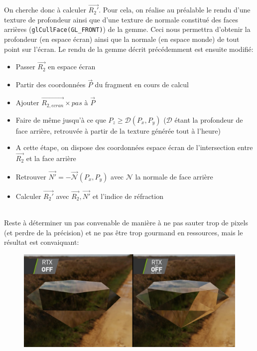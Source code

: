 \documentclass[a4paper,12pt]{article}
\begin{document}
On cherche donc à calculer $\overrightarrow{R_2'}$. Pour cela, on réalise au préalable le rendu d'une texture de profondeur ainsi
que d'une texture de normale constitué des faces arrières (\texttt{glCullFace(GL\_FRONT)}) de la gemme. Ceci nous permettra d'obtenir
la profondeur (en espace écran) ainsi que la normale (en espace monde) de tout point sur l'écran. Le rendu de la gemme décrit précédemment
est ensuite modifié:
\begin{itemize}
    \item Passer $\overrightarrow{R_2}$ en espace écran
    \item Partir des coordonnées $\overrightarrow{P}$ du fragment en cours de calcul
    \item Ajouter $\overrightarrow{R_{2,ecran}}\times pas$ à $\overrightarrow{P}$
    \item Faire de même jusqu'à ce que $P_z \geq \mathcal{D}(P_x, P_y)$ ($\mathcal{D}$ étant la profondeur de face arrière, retrouvée à partir de la texture générée tout à l'heure)
    \item A cette étape, on dispose des coordonnées espace écran de l'intersection entre $\overrightarrow{R_2}$ et la face arrière
    \item Retrouver $\overrightarrow{N'} = -\overrightarrow{\mathcal{N}}(P_x, P_y)$ avec $\mathcal{N}$ la normale de face arrière
    \item Calculer $\overrightarrow{R_2'}$ avec $\overrightarrow{R_2}, \overrightarrow{N'}$ et l'indice de réfraction
\end{itemize}

\ \\
Reste à déterminer un pas convenable de manière à ne pas sauter trop de pixels (et perdre de la précision) et ne pas être
trop gourmand en ressources, mais le résultat est convaiquant:
\begin{figure}[H]
    \centering
    \includegraphics[width=14cm]{intref_cmp.jpg}
\end{figure}
\end{document}
